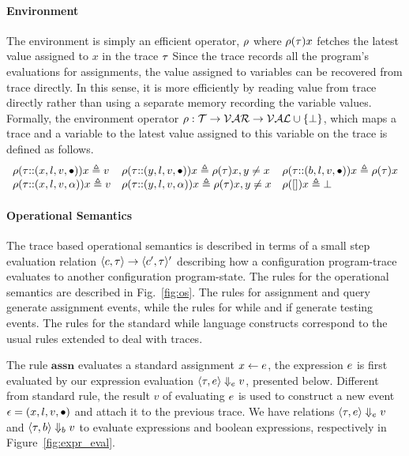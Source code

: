\paragraph{Environment}
{
  The environment is simply an efficient operator, $\rho$ where $\rho(\mathtt{\tau}) x$ fetches the latest value assigned to $x$ in the trace $\mathtt{\tau}$
  Since the trace records all the program's evaluations for assignments, 
  the value assigned to variables can be recovered from trace directly.
  In this sense, it is more efficiently by reading value from trace directly rather than using a separate memory recording the variable values.
}
Formally, the environment operator $\rho : {\mathcal{T}}  \to \mathcal{VAR} \to \mathcal{VAL} \cup \{\bot\}$, 
which maps a trace and a variable to the latest value assigned to this variable on the trace is defined as follows.
\[
\begin{array}{lll}
\rho(\mathtt{\tau}  {\small ::} (x, l, v, \bullet)) x \triangleq v
&
\rho(\mathtt{\tau} {\small ::} (y, l, v, \bullet)) x \triangleq \rho(\mathtt{\tau}) x, y \neq x
&
\rho(\mathtt{\tau} {\small ::} (b, l, v, \bullet)) x \triangleq \rho(\mathtt{\tau}) x
\\
\rho(\mathtt{\tau} {\small ::} (x, l, v, \alpha)) x \triangleq v
&
\rho(\mathtt{\tau} {\small ::} (y, l, v, \alpha)) x \triangleq \rho(\mathtt{\tau}) x, y \neq x
&
\rho({[]} ) x \triangleq \bot
\end{array}
\]

 \paragraph*{Operational Semantics}
 The trace based operational semantics is described in terms of a small step evaluation relation
 $\langle c, \mathtt{\tau} \rangle \to \langle c', \mathtt{\tau} \rangle'$  describing how a configuration program-trace evaluates to another
 configuration program-state. 
 The rules for the operational semantics are described in Fig.~\ref{fig:os}.
 The rules for assignment and query generate assignment events, while the rules for while and if generate testing events. 
 The rules for the standard while language constructs correspond to the usual rules extended to deal with traces. 

The rule $\textbf{assn}$ evaluates a standard assignment $\mathrel{ x \leftarrow e }$, the expression $e$ is first evaluated by our expression evaluation $\langle \mathtt{\tau}, e \rangle \Downarrow_e v $, presented below.
{Different from standard rule, the result $v$ of evaluating $e$ is used to construct a new event $\mathtt{\epsilon} = (x, l, v,\bullet)$
and attach it to the previous trace. }
We have relations $\langle \mathtt{\tau}, e \rangle \Downarrow_e v $  and $\langle \mathtt{\tau}, b \rangle \Downarrow_b v $  to evaluate expressions and boolean expressions, respectively in Figure~\ref{fig:expr_eval}.

